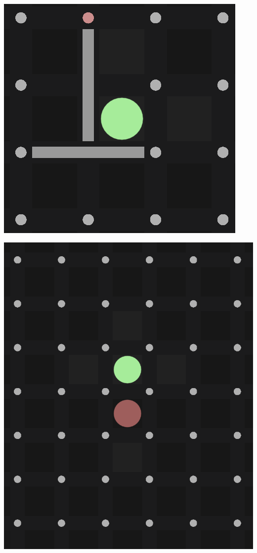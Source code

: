 \documentclass[progress]{cmpreport}
\begin{document}
\begin{minipage}[b]{0.45\textwidth}
    \centering
    \includegraphics[width=\textwidth]{images/fence_placement.png}
\end{minipage}%
\hfill
\begin{minipage}[b]{0.45\textwidth}
    \centering
    \includegraphics[width=\textwidth]{images/pawn_leaping.png}
\end{minipage}
\end{document}
